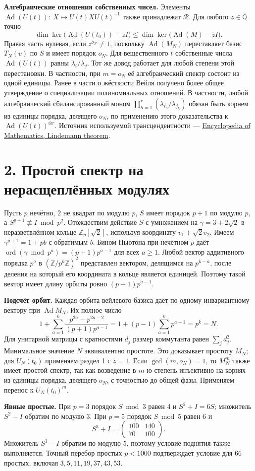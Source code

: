 \documentclass[11pt,a4paper]{article}
\newcommand{\Z}{\mathbb Z}
\newcommand{\sect}[1]{\section*{\sffamily\color{ink}#1}}
\newcommand{\subt}[1]{\par\medskip\noindent\textbf{#1.}\quad}
\newcommand{\Ad}{\operatorname{Ad}}
\newcommand{\kk}{\overline{\mathbb Q}}
\newcommand{\ord}{\operatorname{ord}}
\begin{document}
\subt{Алгебраические отношения собственных чисел}
Элементы \(\Ad(U(t)):\ X\mapsto U(t)XU(t)^{-1}\) также принадлежат \(\mathcal R\). Для любого \(z\in\kk\) точно
\[
       \dim\ker\big(\Ad(U(t_0))-zI\big)
               \le \dim\ker\big(\Ad(M)-zI\big).
\]
Правая часть нулевая, если \(z^{o_N}\ne1\), поскольку \(\Ad(M_N)\) переставляет базис \(T_N(v)\) по \(S\) и имеет порядок \(o_N\). Для вещественного \(t\) собственные числа \(\Ad(U(t))\) равны \(\lambda_i/\lambda_j\). Тот же довод работает для любой степени этой перестановки. В частности, при \(m=o_N\) её алгебраический спектр состоит из одной единицы. Ранее в части о жёсткости Вейля получено более общее утверждение о специализации полиномиальных отношений. В частности, любой алгебраический сбалансированный моном \(\prod_{h=1}^r(\lambda_{i_h}/\lambda_{j_h})\) обязан быть корнем из единицы порядка, делящего \(o_N\), по применению этого доказательства к \(\Ad(U(t))^{\otimes r}\). Источник используемой трансцендентности --- \href{https://encyclopediaofmath.org/wiki/Lindemann_theorem}{Encyclopedia of Mathematics, Lindemann theorem}.
\newpage
\sect{2. Простой спектр на нерасщеплённых модулях}
Пусть \(p\) нечётно, \(2\) не квадрат по модулю \(p\), \(S\) имеет порядок \(p+1\) по модулю \(p\), а \(S^{p+1}\not\equiv I\bmod p^2\). Отождествим действие \(S\) с умножением на \(\gamma=3+2\sqrt2\) в неразветвлённом кольце \(\mathbb Z_p[\sqrt2]\), используя координату \(v_1+\sqrt2 v_2\). Имеем
\(\gamma^{p+1}=1+p b\) с обратимым \(b\). Бином Ньютона при нечётном \(p\) даёт
\(\ord(\gamma\bmod p^a)=(p+1)p^{a-1}\) для всех \(a\ge1\). Любой вектор аддитивного порядка \(p^a\) в \((\Z/p^k\Z)^2\) представлен вектором, делящимся на \(p^{k-a}\), после деления на который его координата в кольце является единицей. Поэтому такой вектор имеет длину орбиты ровно \((p+1)p^{a-1}\).

\subt{Подсчёт орбит}
Каждая орбита вейлевого базиса даёт по одному инвариантному вектору при \(\Ad M_N\). Их полное число
\[
 1+\sum_{a=1}^k\frac{p^{2a}-p^{2a-2}}{(p+1)p^{a-1}}
          =1+(p-1)\sum_{a=1}^kp^{a-1}=p^k=N.
\]
Для унитарной матрицы с кратностями \(d_j\) размер коммутанта равен \(\sum_j d_j^2\). Минимальное значение \(N\) эквивалентно простоте. Это доказывает простоту \(M_N\); для \(U_N(t_0)\) применяем раздел 1 с \(z=1\). Если \(\gcd(m,o_N)=1\), то \(M_N^m\) также имеет простой спектр, так как возведение в \(m\)-ю степень инъективно на корнях из единицы порядка, делящего \(o_N\), с точностью до общей фазы. Применяем перенос к \(U_N(t_0)^m\).

\subt{Явные простые}
При \(p=3\) порядок \(S\bmod3\) равен 4 и \(S^2+I=6S\); множитель \(S^2-I\) обратим по модулю \(3\). При \(p=5\) порядок \(S\bmod5\) равен 6 и
\[
                 S^3+I=\begin{pmatrix}100&140\\70&100\end{pmatrix}.
\]
Множитель \(S^3-I\) обратим по модулю \(5\), поэтому условие поднятия также выполняется. Точный перебор простых \(p<1000\) подтверждает условие для 66 простых, включая \(3,5,11,19,37,43,53\).
\end{document}
